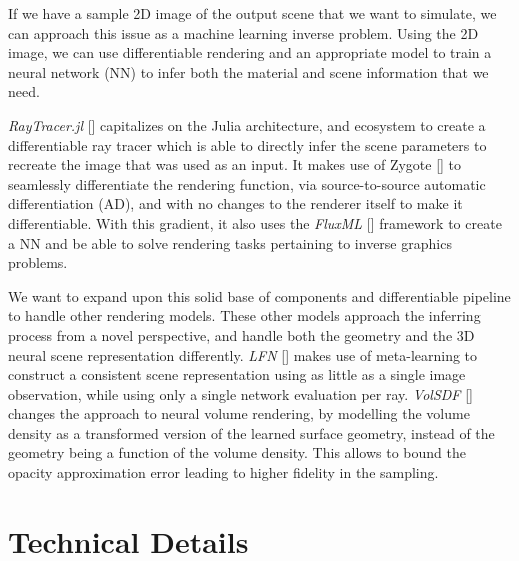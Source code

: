 If we have a sample 2D image of the output scene that we want to simulate, we can approach this issue as a machine learning inverse problem. Using the 2D image, we can use differentiable rendering and an appropriate model to train a neural network (NN) to infer both the material and scene information that we need.

\textit{RayTracer.jl} [\cite{Pal2020}] capitalizes on the Julia architecture, and ecosystem to create a differentiable ray tracer which is able to directly infer the scene parameters to recreate the image that was used as an input. It makes use of Zygote [\cite{Zygote.jl-2018}] to seamlessly differentiate the rendering function, via source-to-source automatic differentiation (AD), and with no changes to the renderer itself to make it differentiable. With this gradient, it also uses the \textit{FluxML} [\cite{Flux.jl-2018}] framework to create a NN and be able to solve rendering tasks pertaining to inverse graphics problems.

We want to expand upon this solid base of components and differentiable pipeline to handle other rendering models. These other models approach the inferring process from a novel perspective, and handle both the geometry and the 3D neural scene representation differently. \textit{LFN} [\cite{NEURIPS2021_a11ce019}] makes use of meta-learning to construct a consistent scene representation using as little as a single image observation, while using only a single network evaluation per ray. \textit{VolSDF} [\cite{NEURIPS2021_25e2a30f}] changes the approach to neural volume rendering, by modelling the volume density as a transformed version of the learned surface geometry, instead of the geometry being a function of the volume density. This allows to bound the opacity approximation error leading to higher fidelity in the sampling.

\section*{Technical Details}



